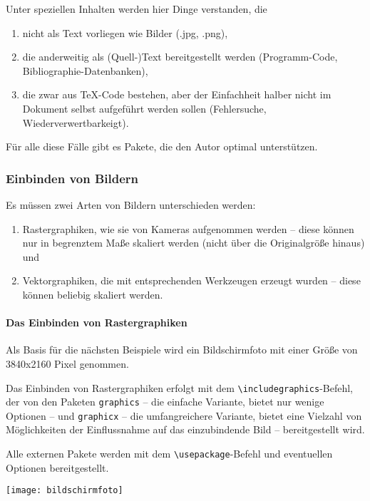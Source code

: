 \documentclass[ngerman,               %
               a4paper,               %
               fleqn,                 %
                     ]{scrartcl}       %
\begin{document}
Unter speziellen Inhalten werden hier Dinge verstanden, die
\begin{enumerate}
  \item nicht als Text vorliegen wie Bilder (.jpg, .png),
  \item die anderweitig als (Quell-)Text bereitgestellt werden
    (Programm-Code, Bibliographie-Datenbanken),
  \item die zwar aus \TeX-Code bestehen, aber der Einfachheit halber
    nicht im Dokument selbst aufgeführt werden sollen (Fehlersuche,
    Wiederverwertbarkeigt).
\end{enumerate}
Für alle diese Fälle gibt es Pakete, die den Autor optimal unterstützen.

\subsubsection{Einbinden von Bildern}

Es müssen zwei Arten von Bildern unterschieden werden:
\begin{enumerate}
  \item Rastergraphiken, wie sie von Kameras aufgenommen werden -- diese
    können nur in begrenztem Maße skaliert werden (nicht über die
    Originalgröße hinaus) und
  \item Vektorgraphiken, die mit entsprechenden Werkzeugen erzeugt wurden
    -- diese können beliebig skaliert werden.
\end{enumerate}

\paragraph{Das Einbinden von Rastergraphiken}

Als Basis für die nächsten Beispiele wird ein Bildschirmfoto mit einer
Größe von 3840x2160 Pixel genommen.

Das Einbinden von Rastergraphiken erfolgt mit dem
\lstinline|\includegraphics|-Befehl, der von den Paketen \texttt{graphics}
-- die einfache Variante, bietet nur wenige Optionen -- und
\texttt{graphicx} -- die umfangreichere Variante, bietet eine Vielzahl von
Möglichkeiten der Einflussnahme auf das einzubindende Bild --
bereitgestellt wird.

Alle externen Pakete werden mit dem \lstinline|\usepackage|-Befehl und
eventuellen Optionen bereitgestellt.

\texttt{[image: bildschirmfoto]} %
\end{document}
